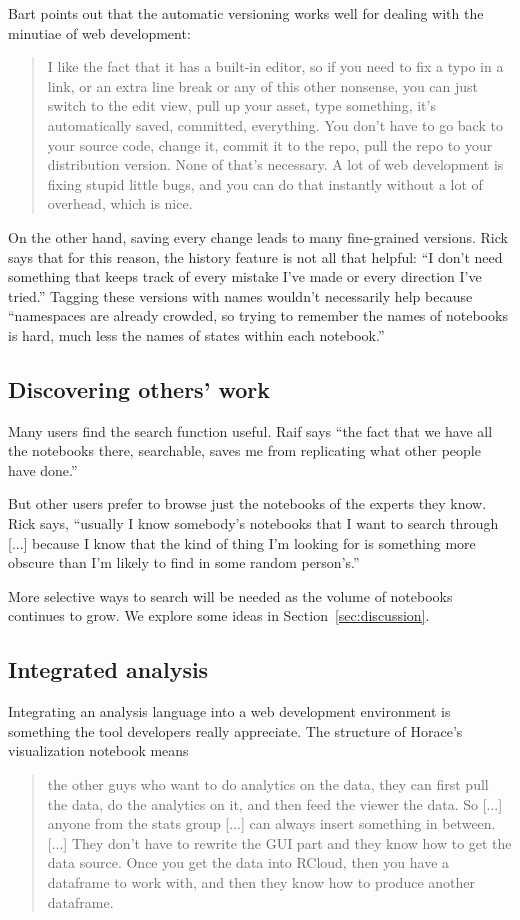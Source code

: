 Bart points out that the automatic versioning works well for dealing with the
minutiae of web development:
\begin{quote}
I like the fact that it has a built-in editor, so
if you need to fix a typo in a link, or an extra line break or any of this other
nonsense, you can just switch to the edit view, pull up your asset, type
something, it's automatically saved, committed, everything. You don't have to go
back to your source code, change it, commit it to the repo, pull the repo to
your distribution version. None of that's necessary. A lot of web development is
fixing stupid little bugs, and you can do that instantly without a lot of
overhead, which is nice.
\end{quote}

On the other hand, saving every change leads to many fine-grained
versions. Rick says that for this reason, the history feature is not all that
helpful: ``I don't need something that keeps track of every mistake I've made or
every direction I've tried.'' Tagging these versions with names wouldn't
necessarily help because ``namespaces are already crowded, so trying to remember
the names of notebooks is hard, much less the names of states within each
notebook.''


\subsection{Discovering others' work}
Many users find the search function useful. Raif says ``the fact that we have
all the notebooks there, searchable, saves me from replicating what other people
have done.''

But other users prefer to browse just the notebooks of the experts they
know. Rick says, ``usually I know somebody's notebooks that I want to search
through [...] because I know that the kind of thing I'm looking for is something
more obscure than I'm likely to find in some random person's.''

More selective ways to search will be needed as the volume of notebooks
continues to grow. We explore some ideas in Section~\ref{sec:discussion}.

\subsection{Integrated analysis}
Integrating an analysis language into a web development environment is something
the tool developers really appreciate.  The structure of Horace's visualization
notebook means
\begin{quote}
the other guys who want to do analytics on the data, they can first pull
the data, do the analytics on it, and then feed the viewer the data. So
[...] anyone from the stats group [...] can always insert something in
between. [...] They don't have to rewrite the GUI part and they know how to
get the data source. Once you get the data into RCloud, then you have a
dataframe to work with, and then they know how to produce another
dataframe.
\end{quote}

